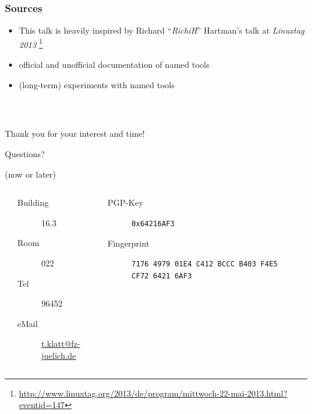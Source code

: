 \documentclass[english,hyperref={pdfpagelabels=false},aspectratio=169]{beamer}
\begin{document}
\begin{frame}
  \frametitle{Sources}
  \begin{itemize}
    \item This talk is heavily inspired by Richard ``\textit{RichiH}'' Hartman's talk at \textit{Linuxtag 2013}
      \footnote{\tiny\url{http://www.linuxtag.org/2013/de/program/mittwoch-22-mai-2013.html?eventid=147}}
    \item official and unofficial documentation of named tools
    \item (long-term) experiments with named tools
  \end{itemize}
\end{frame}

\begin{frame}
  \frametitle{~}
  \begin{center}
    {\huge Thank you for your interest and time!}\par
    \bigskip
    \bigskip
    \bigskip
    {\Large Questions?}\par
    {\scriptsize\color{fzjgray50}(now or later)}\par
    \bigskip
    \bigskip
    \begin{columns}
      \tiny
      \begin{column}{0.1\textwidth}
      \end{column}
      \begin{column}{0.4\textwidth}
        \begin{description}
          \item[Building] 16.3
          \item[Room] 022
          \item[Tel] 96452
          \item[eMail] \href{mailto:t.klatt@fz-juelich.de}{t.klatt@fz-juelich.de}
        \end{description}
      \end{column}
      \begin{column}{0.38\textwidth}
        \begin{description}
          \item[PGP-Key] \texttt{0x64216AF3}
          \item[Fingerprint] \texttt{7176 4979 01E4 C412 BCCC B403 F4E5 CF72 6421 6AF3}
        \end{description}
      \end{column}
      \begin{column}{0.12\textwidth}
      \end{column}
    \end{columns}
  \end{center}
\end{frame}
\end{document}
